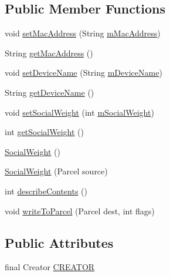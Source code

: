 \subsection*{Public Member Functions}
\begin{DoxyCompactItemize}
\item 
void \hyperlink{classcom_1_1social_1_1proximity_1_1_social_weight_a660888808784a039fa9e62761f42cb56}{set\+Mac\+Address} (String \hyperlink{classcom_1_1social_1_1proximity_1_1_social_weight_aed1c91d7a26e69969def12d0fe48e4a4}{m\+Mac\+Address})
\item 
String \hyperlink{classcom_1_1social_1_1proximity_1_1_social_weight_afc40805bb79878bcc3b2b1ed1b90aabb}{get\+Mac\+Address} ()
\item 
void \hyperlink{classcom_1_1social_1_1proximity_1_1_social_weight_adb58e2271cb3327f2eb645ffc733ad2e}{set\+Device\+Name} (String \hyperlink{classcom_1_1social_1_1proximity_1_1_social_weight_acd7f605dbf810c5d601273cf70b6f0d9}{m\+Device\+Name})
\item 
String \hyperlink{classcom_1_1social_1_1proximity_1_1_social_weight_abe82b3116319cfc64e8a87be75608f43}{get\+Device\+Name} ()
\item 
void \hyperlink{classcom_1_1social_1_1proximity_1_1_social_weight_a7a5d475fb26ba400ad658109eaaf13ee}{set\+Social\+Weight} (int \hyperlink{classcom_1_1social_1_1proximity_1_1_social_weight_ae500aa203aee4493c114fbd2bbeb654c}{m\+Social\+Weight})
\item 
int \hyperlink{classcom_1_1social_1_1proximity_1_1_social_weight_a902b1316ba8dd9bcca23e6bef85271a4}{get\+Social\+Weight} ()
\item 
\hyperlink{classcom_1_1social_1_1proximity_1_1_social_weight_a16b05f97acc80b23f188bb3b9b4fe62d}{Social\+Weight} ()
\item 
\hyperlink{classcom_1_1social_1_1proximity_1_1_social_weight_ae81d301c0fc7ff4b57862afae71777a3}{Social\+Weight} (Parcel source)
\item 
int \hyperlink{classcom_1_1social_1_1proximity_1_1_social_weight_a2ba69bbc7275a8b2a473a3be11cfaa6b}{describe\+Contents} ()
\item 
void \hyperlink{classcom_1_1social_1_1proximity_1_1_social_weight_ad535ed35c415b459848e1f909f9a9af8}{write\+To\+Parcel} (Parcel dest, int flags)
\end{DoxyCompactItemize}
\subsection*{Public Attributes}
\begin{DoxyCompactItemize}
\item 
final Creator \hyperlink{classcom_1_1social_1_1proximity_1_1_social_weight_a009e0d47a26f8b058f002df215d1c463}{C\+R\+E\+A\+T\+O\+R}
\end{DoxyCompactItemize}
